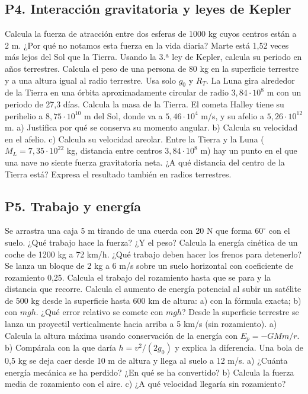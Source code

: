 \documentclass[11pt,a4paper]{article}
\begin{document}
\subsection*{P4. Interacción gravitatoria y leyes de Kepler}
\begin{enumerate}[leftmargin=1.4cm,itemsep=5pt]
 Calcula la fuerza de atracción entre dos esferas de 1000 kg cuyos centros están a 2 m. ¿Por qué no notamos esta fuerza en la vida diaria?
 Marte está 1,52 veces más lejos del Sol que la Tierra. Usando la 3.ª ley de Kepler, calcula su periodo en años terrestres.
 Calcula el peso de una persona de 80 kg en la superficie terrestre y a una altura igual al radio terrestre. Usa solo $g_0$ y $R_T$.
 La Luna gira alrededor de la Tierra en una órbita aproximadamente circular de radio $3{,}84\cdot10^8$ m con un periodo de 27,3 días. Calcula la masa de la Tierra.
 El cometa Halley tiene su perihelio a $8{,}75\cdot10^{10}$ m del Sol, donde va a $5{,}46\cdot10^4$ m/s, y su afelio a $5{,}26\cdot10^{12}$ m. a) Justifica por qué se conserva su momento angular. b) Calcula su velocidad en el afelio. c) Calcula su velocidad areolar.
 Entre la Tierra y la Luna ($M_L=7{,}35\cdot10^{22}$ kg, distancia entre centros $3{,}84\cdot10^8$ m) hay un punto en el que una nave no siente fuerza gravitatoria neta. ¿A qué distancia del centro de la Tierra está? Expresa el resultado también en radios terrestres.
\end{enumerate}

\subsection*{P5. Trabajo y energía}
\begin{enumerate}[leftmargin=1.4cm,itemsep=5pt]
 Se arrastra una caja 5 m tirando de una cuerda con 20 N que forma $60^\circ$ con el suelo. ¿Qué trabajo hace la fuerza? ¿Y el peso?
 Calcula la energía cinética de un coche de 1200 kg a 72 km/h. ¿Qué trabajo deben hacer los frenos para detenerlo?
 Se lanza un bloque de 2 kg a 6 m/s sobre un suelo horizontal con coeficiente de rozamiento 0,25. Calcula el trabajo del rozamiento hasta que se para y la distancia que recorre.
 Calcula el aumento de energía potencial al subir un satélite de 500 kg desde la superficie hasta 600 km de altura: a) con la fórmula exacta; b) con $mgh$. ¿Qué error relativo se comete con $mgh$?
 Desde la superficie terrestre se lanza un proyectil verticalmente hacia arriba a 5 km/s (sin rozamiento). a) Calcula la altura máxima usando conservación de la energía con $E_p=-GMm/r$. b) Compárala con la que daría $h=v^2/(2g_0)$ y explica la diferencia.
 Una bola de 0,5 kg se deja caer desde 10 m de altura y llega al suelo a 12 m/s. a) ¿Cuánta energía mecánica se ha perdido? ¿En qué se ha convertido? b) Calcula la fuerza media de rozamiento con el aire. c) ¿A qué velocidad llegaría sin rozamiento?
\end{enumerate}
\end{document}
